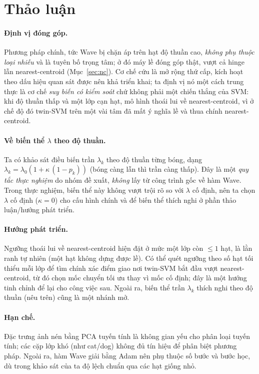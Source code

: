 \documentclass[11pt,a4paper]{article}
\begin{document}
\section{Thảo luận}
\label{sec:discussion}
\paragraph{Định vị đóng góp.} Phương pháp chính, tức Wave bị chặn áp trên hạt độ thuần cao, \emph{không phụ thuộc loại nhiễu} và là tuyên bố trọng tâm; ở đó máy lề đóng góp thật, vượt cả hinge lẫn nearest-centroid (Mục~\ref{sec:nc}). Cơ chế cứu là mở rộng thứ cấp, kích hoạt theo dấu hiệu quan sát được nên khả triển khai; ta định vị nó một cách trung thực là cơ chế \emph{suy biến có kiểm soát} chứ không phải một chiến thắng của SVM: khi độ thuần thấp và một lớp cạn hạt, mô hình thoái lui về nearest-centroid, vì ở chế độ đó twin-SVM trên một vài tâm đã mất ý nghĩa lề và thua chính nearest-centroid.

\paragraph{Về biến thể $\lambda$ theo độ thuần.} Ta có khảo sát điều biến trần $\lambda_k$ theo độ thuần từng bóng, dạng $\lambda_k=\lambda_0(1+\kappa\,(1-p_k))$ (bóng càng lẫn thì trần càng thấp). Đây là một \emph{quy tắc thực nghiệm} do nhóm đề xuất, \emph{không} lấy từ công trình gốc về hàm Wave. Trong thực nghiệm, biến thể này không vượt trội rõ so với $\lambda$ cố định, nên ta chọn $\lambda$ cố định ($\kappa=0$) cho cấu hình chính và để biến thể thích nghi ở phần thảo luận/hướng phát triển.

\paragraph{Hướng phát triển.} Ngưỡng thoái lui về nearest-centroid hiện đặt ở mức một lớp còn $\le 1$ hạt, là lằn ranh tự nhiên (một hạt không dựng được lề). Có thể quét ngưỡng theo số hạt tối thiểu mỗi lớp để tìm chính xác điểm giao nơi twin-SVM bắt đầu vượt nearest-centroid, từ đó chọn mốc chuyển tối ưu thay vì mốc cố định; đây là một hướng tinh chỉnh để lại cho công việc sau. Ngoài ra, biến thể trần $\lambda_k$ thích nghi theo độ thuần (nêu trên) cũng là một nhánh mở.

\paragraph{Hạn chế.} Đặc trưng ảnh nén bằng PCA tuyến tính là không gian yếu cho phân loại tuyến tính; các cặp lớp khó (như cat/dog) không đủ tín hiệu để phân biệt phương pháp. Ngoài ra, hàm Wave giải bằng Adam nên phụ thuộc số bước và bước học, dù trong khảo sát của ta độ lệch chuẩn qua các hạt giống nhỏ.
\end{document}
